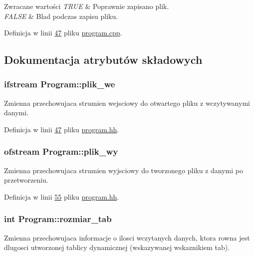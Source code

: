 \begin{DoxyRetVals}{Zwracane wartości}
{\em T\-R\-U\-E} & Poprawnie zapisano plik. \\
\hline
{\em F\-A\-L\-S\-E} & Blad podczas zapisu pliku. \\
\hline
\end{DoxyRetVals}


Definicja w linii \hyperlink{program_8cpp_source_l00047}{47} pliku \hyperlink{program_8cpp_source}{program.\-cpp}.



\subsection{Dokumentacja atrybutów składowych}
\hypertarget{class_program_aac2f72538e24e533c327fe5546a59210}{
\subsubsection[{plik\-\_\-we}]{\setlength{\rightskip}{0pt plus 5cm}ifstream Program\-::plik\-\_\-we\hspace{0.3cm}{\ttfamily [protected]}}}\label{class_program_aac2f72538e24e533c327fe5546a59210}
Zmienna przechowujaca strumien wejsciowy do otwartego pliku z wczytywanymi danymi. 

Definicja w linii \hyperlink{program_8hh_source_l00047}{47} pliku \hyperlink{program_8hh_source}{program.\-hh}.

\hypertarget{class_program_a59c1761a5ea875b3d5a4678928f3a1de}{
\subsubsection[{plik\-\_\-wy}]{\setlength{\rightskip}{0pt plus 5cm}ofstream Program\-::plik\-\_\-wy\hspace{0.3cm}{\ttfamily [protected]}}}\label{class_program_a59c1761a5ea875b3d5a4678928f3a1de}
Zmienna przechowujaca strumien wyjsciowy do tworzonego pliku z danymi po przetworzeniu. 

Definicja w linii \hyperlink{program_8hh_source_l00055}{55} pliku \hyperlink{program_8hh_source}{program.\-hh}.

\hypertarget{class_program_a3b5a10104019b9daa23ce4a5f5533820}{
\subsubsection[{rozmiar\-\_\-tab}]{\setlength{\rightskip}{0pt plus 5cm}int Program\-::rozmiar\-\_\-tab\hspace{0.3cm}{\ttfamily [protected]}}}\label{class_program_a3b5a10104019b9daa23ce4a5f5533820}
Zmienna przechowujaca informacje o ilosci wczytanych danych, ktora rowna jest dlugosci utworzonej tablicy dynamicznej (wskazywanej wskaznikiem tab). 

